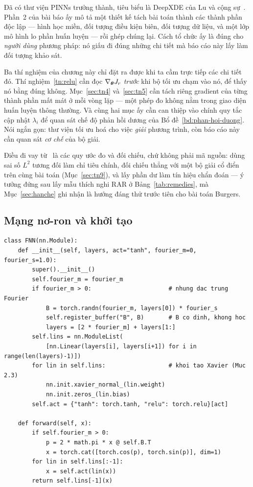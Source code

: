 \begin{nhanxet}
\label{nx:vi-sao-tu-viet}
Đã có thư viện PINNs trưởng thành, tiêu biểu là DeepXDE của Lu và cộng
sự~\cite{lu2021}. Phần~2 của bài báo ấy mô tả một thiết kế tách bài toán thành
các thành phần độc lập --- hình học miền, đối tượng điều kiện biên, đối tượng dữ
liệu, và một lớp mô hình lo phần huấn luyện --- rồi ghép chúng lại. Cách tổ chức ấy là đúng cho \emph{người dùng}
phương pháp: nó giấu đi đúng những chi tiết mà báo cáo này lấy làm đối tượng
khảo sát.

Ba thí nghiệm của chương này chỉ đặt ra được khi ta cầm trực tiếp các chi tiết
đó. Thí nghiệm~\ref{tn:relu} cần đọc $\nabla_{\bm{\theta}}J_r$ \emph{trước} khi bộ
tối ưu chạm vào nó, để thấy nó bằng đúng không. Mục~\ref{sec:tn4} và~\ref{sec:tn5} cần tách
riêng gradient của từng thành phần mất mát ở mỗi vòng lặp --- một phép đo không
nằm trong giao diện huấn luyện thông thường. Và cùng hai mục ấy cần
can thiệp vào chính quy tắc cập nhật $\lambda_i$ để quan sát chế độ phản hồi
dương của Bổ đề~\ref{bd:phan-hoi-duong}. Nói ngắn gọn: thư viện tối ưu hoá cho
việc \emph{giải} phương trình, còn báo cáo này cần quan sát \emph{cơ chế} của
bộ giải.

Điều đi vay từ~\cite{lu2021} là các quy ước đo và đối chiếu, chứ không phải mã
nguồn: dùng sai số $L^2$ tương đối làm chỉ tiêu chính, đối chiếu thẳng với một
bộ giải cổ điển trên cùng bài toán (Mục~\ref{sec:tn9}), và lấy phần dư làm tín
hiệu chẩn đoán --- ý tưởng đứng sau lấy mẫu thích nghi RAR ở
Bảng~\ref{tab:remedies}, mà Mục~\ref{sec:hanche} ghi nhận là hướng đáng thử
trước tiên cho bài toán Burgers.
\end{nhanxet}
 
\subsection{Mạng nơ-ron và khởi tạo}
 
\begin{lstlisting}[caption={Mạng truyền thẳng với khởi tạo Xavier và nhúng đặc trưng Fourier tuỳ chọn.},label={lst:fnn}]
class FNN(nn.Module):
    def __init__(self, layers, act="tanh", fourier_m=0, fourier_s=1.0):
        super().__init__()
        self.fourier_m = fourier_m
        if fourier_m > 0:                      # nhung dac trung Fourier
            B = torch.randn(fourier_m, layers[0]) * fourier_s
            self.register_buffer("B", B)       # B co dinh, khong hoc
            layers = [2 * fourier_m] + layers[1:]
        self.lins = nn.ModuleList(
            [nn.Linear(layers[i], layers[i+1]) for i in range(len(layers)-1)])
        for lin in self.lins:                  # khoi tao Xavier (Muc 2.3)
            nn.init.xavier_normal_(lin.weight)
            nn.init.zeros_(lin.bias)
        self.act = {"tanh": torch.tanh, "relu": torch.relu}[act]
 
    def forward(self, x):
        if self.fourier_m > 0:
            p = 2 * math.pi * x @ self.B.T
            x = torch.cat([torch.cos(p), torch.sin(p)], dim=1)
        for lin in self.lins[:-1]:
            x = self.act(lin(x))
        return self.lins[-1](x)
\end{lstlisting}
 
